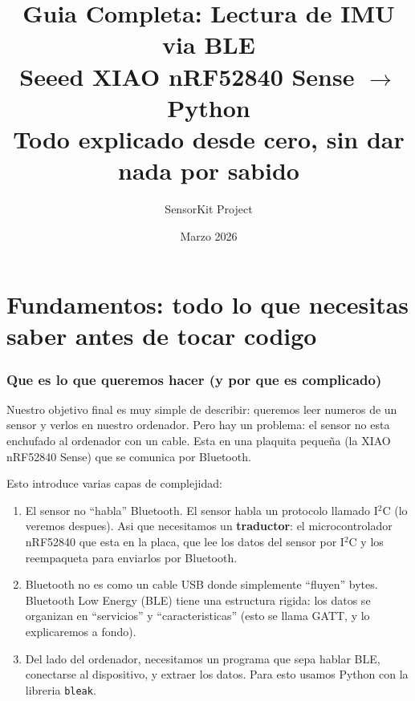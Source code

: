 \documentclass[11pt,a4paper]{article}
\title{%
    \vspace{-1cm}
    \textbf{Guia Completa: Lectura de IMU via BLE}\\[6pt]
    \large Seeed XIAO nRF52840 Sense $\rightarrow$ Python\\[4pt]
    \normalsize Todo explicado desde cero, sin dar nada por sabido
}
\author{SensorKit Project}
\date{Marzo 2026}
\begin{document}
\maketitle
\tableofcontents
\newpage


\part{Fundamentos: todo lo que necesitas saber antes de tocar codigo}


\section{Que es lo que queremos hacer (y por que es complicado)}

Nuestro objetivo final es muy simple de describir: queremos leer
numeros de un sensor y verlos en nuestro ordenador. Pero hay un
problema: el sensor no esta enchufado al ordenador con un cable.
Esta en una plaquita pequeña (la XIAO nRF52840 Sense) que se
comunica por Bluetooth.

Esto introduce varias capas de complejidad:

\begin{enumerate}
    \item El sensor no ``habla'' Bluetooth. El sensor habla un
          protocolo llamado I$^2$C (lo veremos despues). Asi que
          necesitamos un \textbf{traductor}: el microcontrolador
          nRF52840 que esta en la placa, que lee los datos del
          sensor por I$^2$C y los reempaqueta para enviarlos por
          Bluetooth.

    \item Bluetooth no es como un cable USB donde simplemente
          ``fluyen'' bytes. Bluetooth Low Energy (BLE) tiene una
          estructura rigida: los datos se organizan en ``servicios''
          y ``caracteristicas'' (esto se llama GATT, y lo
          explicaremos a fondo).

    \item Del lado del ordenador, necesitamos un programa que sepa
          hablar BLE, conectarse al dispositivo, y extraer los
          datos. Para esto usamos Python con la libreria
          \texttt{bleak}.
\end{enumerate}
\end{document}
